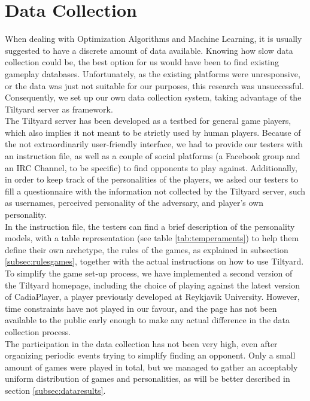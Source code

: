 \section{Data Collection}\label{sec:datacolme}
When dealing with Optimization Algorithms and Machine Learning, it is usually suggested to have a discrete amount of data available. Knowing how slow data collection could be, the best option for us would have been to find existing gameplay databases. Unfortunately, as the existing platforms were unresponsive, or the data was just not suitable for our purposes, this research was unsuccessful. Consequently, we set up our own data collection system, taking advantage of the Tiltyard server\cite{tiltyard} as framework. \\
The Tiltyard server has been developed as a testbed for general game players, which also implies it not meant to be strictly used by human players. Because of the not extraordinarily user-friendly interface, we had to provide our testers with an instruction file\cite{datacollection}, as well as a couple of social platforms (a Facebook group and an IRC Channel, to be specific) to find opponents to play against. 
Additionally, in order to keep track of the personalities of the players, we asked our testers to fill a questionnaire with the information not collected by the Tiltyard server, such as usernames, perceived personality of the adversary, and player's own personality.\\
In the instruction file\cite{datacollection}, the testers can find a brief description of the personality models, with a table representation (see table \ref{tab:temperaments}) to help them define their own archetype, the rules of the games, as explained in subsection \ref{subsec:rulesgames}, together with the actual instructions on how to use Tiltyard.\\
To simplify the game set-up process, we have implemented a second version of the Tiltyard homepage, including the choice of playing against the latest version of CadiaPlayer\cite{cadiaplayer, finnsson2007cadia, bjornsson2009cadiaplayer}, a player previously developed at Reykjavik University. However, time constraints have not played in our favour, and the page has not been available to the public early enough to make any actual difference in the data collection process. \\
The participation in the data collection has not been very high, even after organizing periodic events trying to simplify finding an opponent. Only a small amount of games were played in total, but we managed to gather an acceptably uniform distribution of games and personalities, as will be better described in section \ref{subsec:dataresults}.
